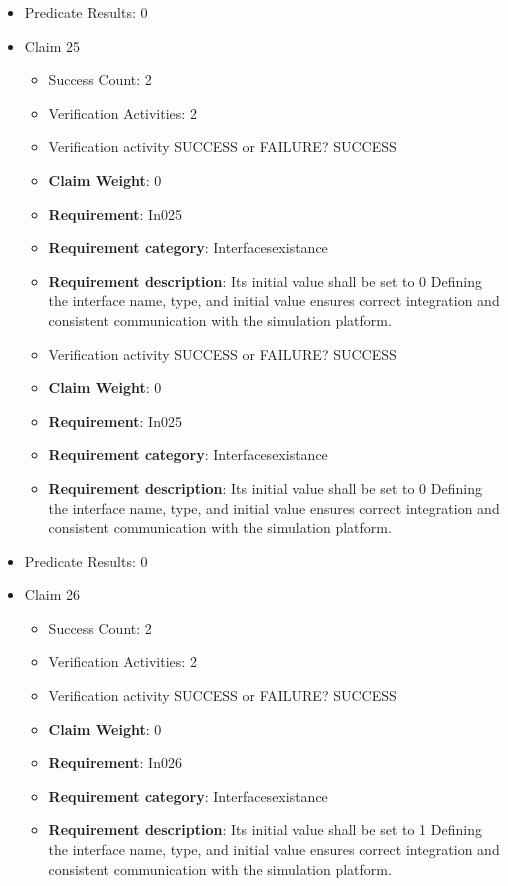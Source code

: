 \documentclass{article}
\begin{document}
\begin{itemize}
									    
				\item Predicate Results: 0

  				  \item Claim 25
				\begin{itemize}
			    	\item Success Count: 2 
			    	\item Verification Activities: 2
					\item Verification activity SUCCESS or FAILURE? SUCCESS
					\item \textbf{Claim Weight}: 0
						\item \textbf{Requirement}: In025 
						\item \textbf{Requirement category}: Interfacesexistance 
						\item \textbf{Requirement description}: Its initial value shall be set to 0 Defining the interface name, type, and initial value ensures correct integration and consistent communication with the simulation platform.
					
					\item Verification activity SUCCESS or FAILURE? SUCCESS
					\item \textbf{Claim Weight}: 0
						\item \textbf{Requirement}: In025 
						\item \textbf{Requirement category}: Interfacesexistance 
						\item \textbf{Requirement description}: Its initial value shall be set to 0 Defining the interface name, type, and initial value ensures correct integration and consistent communication with the simulation platform.
					
				\end{itemize}
				
									    
				\item Predicate Results: 0

  				  \item Claim 26
				\begin{itemize}
			    	\item Success Count: 2 
			    	\item Verification Activities: 2
					\item Verification activity SUCCESS or FAILURE? SUCCESS
					\item \textbf{Claim Weight}: 0
						\item \textbf{Requirement}: In026 
						\item \textbf{Requirement category}: Interfacesexistance 
						\item \textbf{Requirement description}: Its initial value shall be set to 1 Defining the interface name, type, and initial value ensures correct integration and consistent communication with the simulation platform.
					

\end{itemize}
\end{itemize}
\end{document}
